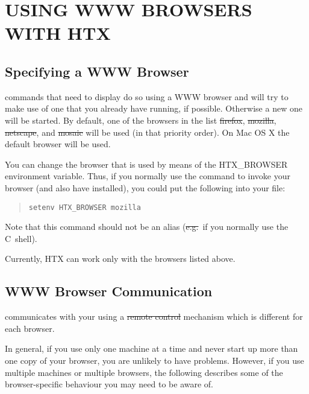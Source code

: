 \section{\label{sect:usingwwwbrowsers}USING WWW BROWSERS WITH HTX}

\subsection{\label{sect:specifyingabrowser}Specifying a WWW Browser}

 commands that need to display
 do so using a WWW browser
and will try to make use of one that you already have running, if
possible. Otherwise a new one will be started. By default, one of the
browsers in the list \st{firefox}, \st{mozilla}, \st{netscape},
and \st{mosaic} will be used (in that priority order). On Mac OS X
the default browser will be used.

You can change the browser that is used by means of the HTX\_BROWSER
environment variable. Thus, if you normally use the command  to
invoke your browser (and also have  installed), you could put the
following into your  file:

\begin{quote}
\begin{verbatim}
setenv HTX_BROWSER mozilla
\end{verbatim}
\end{quote}

Note that this command should not be an alias (\st{e.g.}\ if you
normally use the C~shell).

Currently, HTX can work only with the browsers listed above.

\subsection{\label{sect:browsercommunication}WWW Browser Communication}

 communicates with your  using a \st{remote control} mechanism
which is different for each browser.

In general, if you use only one machine at a time and never start up
more than one copy of your browser, you are unlikely to have
problems. However, if you use multiple machines or multiple browsers,
the following describes some of the browser-specific behaviour you may
need to be aware of.

